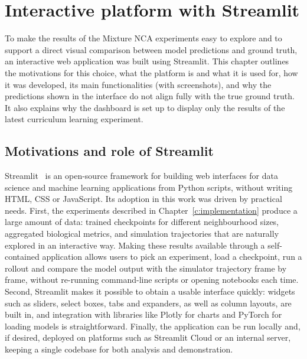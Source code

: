 \chapter{Interactive platform with Streamlit}
\label{c:streamlit}

To make the results of the Mixture NCA experiments easy to explore and to support a direct visual comparison between model predictions and ground truth, an interactive web application was built using Streamlit.
This chapter outlines the motivations for this choice, what the platform is and what it is used for, how it was developed, its main functionalities (with screenshots), and why the predictions shown in the interface do not align fully with the true ground truth.
It also explains why the dashboard is set up to display only the results of the latest curriculum learning experiment.

\section{Motivations and role of Streamlit}

Streamlit~\cite{streamlit2022} is an open-source framework for building web interfaces for data science and machine learning applications from Python scripts, without writing HTML, CSS or JavaScript.
Its adoption in this work was driven by practical needs.
First, the experiments described in Chapter~\ref{c:implementation} produce a large amount of data: trained checkpoints for different neighbourhood sizes, aggregated biological metrics, and simulation trajectories that are naturally explored in an interactive way.
Making these results available through a self-contained application allows users to pick an experiment, load a checkpoint, run a rollout and compare the model output with the simulator trajectory frame by frame, without re-running command-line scripts or opening notebooks each time.
Second, Streamlit makes it possible to obtain a usable interface quickly: widgets such as sliders, select boxes, tabs and expanders, as well as column layouts, are built in, and integration with libraries like Plotly for charts and PyTorch for loading models is straightforward.
Finally, the application can be run locally and, if desired, deployed on platforms such as Streamlit Cloud or an internal server, keeping a single codebase for both analysis and demonstration.

